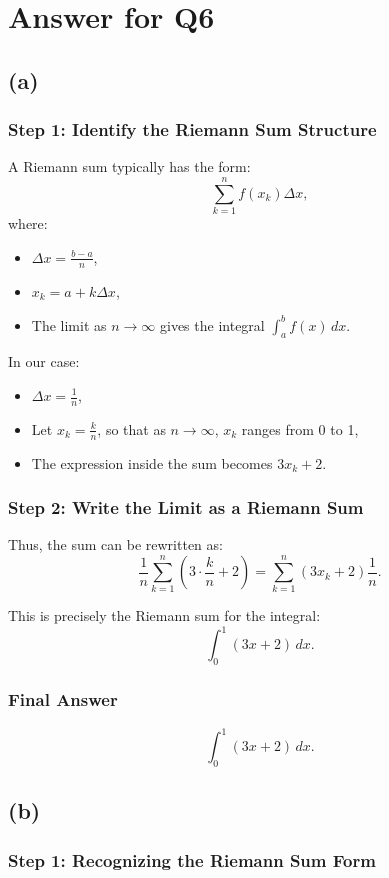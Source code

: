 \documentclass{article}
\begin{document}
\section*{Answer for Q6}
\subsection*{(a)}
\subsubsection*{Step 1: Identify the Riemann Sum Structure}
A Riemann sum typically has the form:
\[
\sum_{k=1}^n f(x_k) \Delta x,
\]
where:
\begin{itemize}
    \item \(\Delta x = \frac{b - a}{n}\),
    \item \(x_k = a + k \Delta x\),
    \item The limit as \(n \to \infty\) gives the integral \(\int_a^b f(x) \, dx\).
\end{itemize}

In our case:
\begin{itemize}
    \item \(\Delta x = \frac{1}{n}\),
    \item Let \(x_k = \frac{k}{n}\), so that as \(n \to \infty\), \(x_k\) ranges from 0 to 1,
    \item The expression inside the sum becomes \(3x_k + 2\).
\end{itemize}

\subsubsection*{Step 2: Write the Limit as a Riemann Sum}
Thus, the sum can be rewritten as:
\[
\frac{1}{n}\sum_{k=1}^n \left(3 \cdot \frac{k}{n} + 2\right) 
= \sum_{k=1}^n \left(3x_k + 2\right) \frac{1}{n}.
\]

This is precisely the Riemann sum for the integral:
\[
\int_0^1 (3x + 2) \, dx.
\]

\subsubsection*{Final Answer}

\[
\boxed{\int_0^1 (3x + 2) \, dx.}
\]
\subsection*{(b)}
\subsubsection*{Step 1: Recognizing the Riemann Sum Form}
\end{document}
